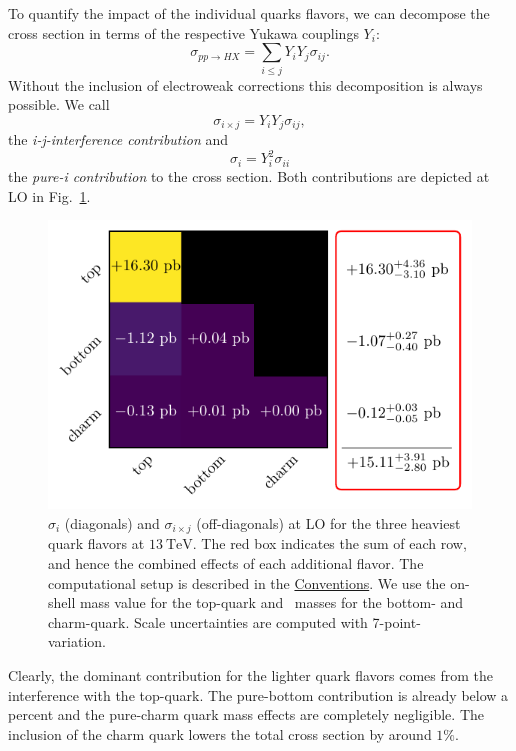 To quantify the impact of the individual quarks flavors, we can decompose the cross section in terms of the respective Yukawa couplings $Y_i$:
\begin{equation}
\sigma_{pp \rightarrow HX} =  \sum_{i\le j} Y_i Y_j \sigma_{i j}.
\end{equation}
Without the inclusion of electroweak corrections this decomposition is always possible. We call
\begin{equation}
\sigma_{i \times j} = Y_i Y_j \sigma_{ij},
\end{equation}
the \textit{i-j-interference contribution} and
\begin{equation}
\sigma_{i} = Y_i^2 \sigma_{ii}
\end{equation}
the \textit{pure-i contribution} to the cross section. Both contributions are depicted at \acs{LO} in Fig.~\ref{fig:4:quark_effects}.
\begin{figure}[ht]
\centering
\includegraphics[scale=0.9]{Images/quark_effects_LO.pdf}
\caption{$\sigma_{i}$ (diagonals) and $\sigma_{i \times j}$ (off-diagonals) at \acs{LO} for the three heaviest quark flavors at $13\ \mathrm{TeV}$. The red box indicates the sum of each row, and hence the combined effects of each additional flavor. The computational setup is described in the \hyperref[chap:notation_and_conventions]{Conventions}. We use the on-shell mass value for the top-quark and \MS\ masses for the bottom- and charm-quark. Scale uncertainties are computed with 7-point-variation.}
\label{fig:4:quark_effects}
\end{figure}
Clearly, the dominant contribution for the lighter quark flavors comes from the interference with the top-quark. The pure-bottom contribution is already below a percent and the pure-charm quark mass effects are completely negligible. The inclusion of the charm quark lowers the total cross section by around $1\%$.


